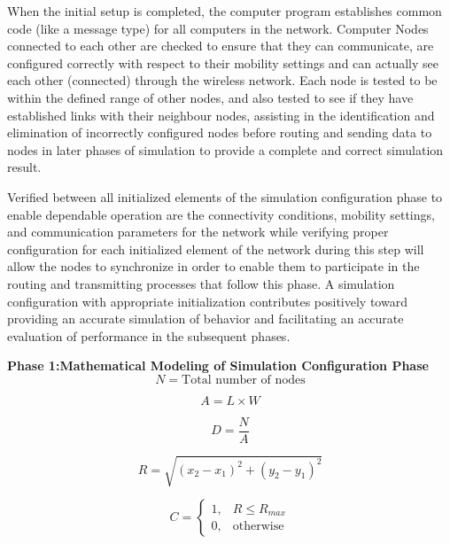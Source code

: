 \documentclass[a4paper,fleqn]{cas-dc}
\numberwithin{equation}{section}
\begin{document}
When the initial setup is completed, the computer program establishes common code (like a message type) for all computers in the network. Computer Nodes connected to each other are checked to ensure that they can communicate, are configured correctly with respect to their mobility settings and can actually see each other (connected) through the wireless network. Each node is tested to be within the defined range of other nodes, and also tested to see if they have established links with their neighbour nodes, assisting in the identification and elimination of incorrectly configured nodes before routing and sending data to nodes in later phases of simulation to provide a complete and correct simulation result.

Verified between all initialized elements of the simulation configuration phase to enable dependable operation are the connectivity conditions, mobility settings, and communication parameters for the network while verifying proper configuration for each initialized element of the network during this step will allow the nodes to synchronize in order to enable them to participate in the routing and transmitting processes that follow this phase. A simulation configuration with appropriate initialization contributes positively toward providing an accurate simulation of behavior and facilitating an accurate evaluation of performance in the subsequent phases.

\textbf{Phase 1:Mathematical Modeling of Simulation Configuration Phase}
\begin{equation}
N = \text{Total number of nodes}
\label{eq:sc1}
\end{equation}

\begin{equation}
A = L \times W
\label{eq:sc2}
\end{equation}

\begin{equation}
D = \frac{N}{A}
\label{eq:sc3}
\end{equation}

\begin{equation}
R = \sqrt{(x_2 - x_1)^2 + (y_2 - y_1)^2}
\label{eq:sc4}
\end{equation}

\begin{equation}
C = \begin{cases}
1, & R \leq R_{max} \\
0, & \text{otherwise}
\end{cases}
\label{eq:sc5}
\end{equation}
\end{document}
